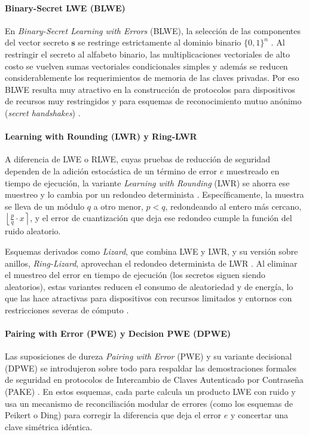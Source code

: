 \paragraph{Binary-Secret LWE (BLWE)}
\label{sec:blwe}
En \textit{Binary-Secret Learning with Errors} (BLWE), la selección de las componentes del vector secreto $\mathbf{s}$ se restringe estrictamente al dominio binario $\{0, 1\}^n$ \cite{an2023secrethandshakes}. Al restringir el secreto al alfabeto binario, las multiplicaciones vectoriales de alto costo se vuelven sumas vectoriales condicionales simples y además se reducen considerablemente los requerimientos de memoria de las claves privadas. Por eso BLWE resulta muy atractivo en la construcción de protocolos para dispositivos de recursos muy restringidos y para esquemas de reconocimiento mutuo anónimo (\textit{secret handshakes}) \cite{an2023secrethandshakes}.

\paragraph{Learning with Rounding (LWR) y Ring-LWR}
A diferencia de LWE o RLWE, cuyas pruebas de reducción de seguridad dependen de la adición estocástica de un término de error $e$ muestreado en tiempo de ejecución, la variante \textit{Learning with Rounding} (LWR) se ahorra ese muestreo y lo cambia por un redondeo determinista \cite{mukil2026implementing}. Específicamente, la muestra se lleva de un módulo $q$ a otro menor, $p < q$, redondeando al entero más cercano, $\left\lfloor \frac{p}{q} \cdot x \right\rceil$, y el error de cuantización que deja ese redondeo cumple la función del ruido aleatorio.

Esquemas derivados como \textit{Lizard}, que combina LWE y LWR, y su versión sobre anillos, \textit{Ring-Lizard}, aprovechan el redondeo determinista de LWR \cite{mukil2026implementing}. Al eliminar el muestreo del error en tiempo de ejecución (los secretos siguen siendo aleatorios), estas variantes reducen el consumo de aleatoriedad y de energía, lo que las hace atractivas para dispositivos con recursos limitados y entornos con restricciones severas de cómputo \cite{mukil2026implementing}.

\paragraph{Pairing with Error (PWE) y Decision PWE (DPWE)}
\label{sec:pwe}
Las suposiciones de dureza \textit{Pairing with Error} (PWE) y su variante decisional (DPWE) se introdujeron sobre todo para respaldar las demostraciones formales de seguridad en protocolos de Intercambio de Claves Autenticado por Contraseña (PAKE) \cite{yang2025multiserver, rewal2023quantumsafe}. En estos esquemas, cada parte calcula un producto LWE con ruido y usa un mecanismo de reconciliación modular de errores (como los esquemas de Peikert o Ding) para corregir la diferencia que deja el error $e$ y concertar una clave simétrica idéntica.

